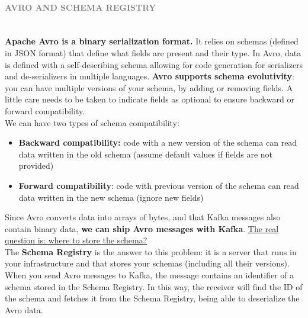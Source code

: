\documentclass[10pt,a4paper]{article}
\newcommand{\myparagraph}[1]{\paragraph{\normalsize{\textcolor{gray}{\uppercase{\textbf{#1}}}} }\mbox{} \vspace{0.5em}\\}
\begin{document}
\myparagraph{Avro and Schema Registry}
\textbf{Apache Avro is a binary serialization format.} It relies on schemas (defined in JSON format) that define what fields are present and their type. In Avro, data is defined with a self-describing schema allowing for code generation for serializers and de-serializers in multiple languages. \textbf{Avro supports schema evolutivity}: you can have multiple versions of your schema, by adding or removing fields. A little care needs to be taken to indicate fields as optional to ensure backward or forward compatibility. \\
We can have two types of schema compatibility:
\begin{itemize}
	\item \textbf{Backward compatibility:} code with a new version of the schema can read data written in the old schema (assume default values if fields are not provided)
	\item \textbf{Forward compatibility}: code with previous version of the schema can read data written in the new schema (ignore new fields)
\end{itemize}
Since Avro converts data into arrays of bytes, and that Kafka messages also contain binary data, \textbf{we can ship Avro messages with Kafka}. \uline{The real question is: where to store the schema?} \\
The \textbf{Schema Registry }is the answer to this problem: it is a server that runs in your infrastructure and that stores your schemas (including all their versions). When you send Avro messages to Kafka, the message contains an identifier of a schema stored in the Schema Registry. In this way, the receiver will find the ID of the schema and fetches it from the Schema Registry, being able to deserialize the Avro data.
\end{document}

